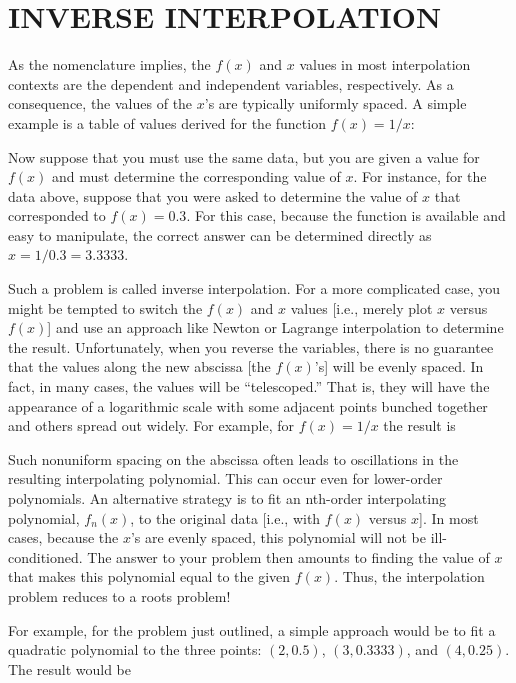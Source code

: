 \documentclass[../main.tex]{subfiles}
\begin{document}
\label{cha:cha_P_17_4} %
\section{INVERSE INTERPOLATION}

\noindent As the nomenclature implies, the $f (x)$ and $x$ values in most interpolation contexts are the
dependent and independent variables, respectively. As a consequence, the values of the $x$'s
are typically uniformly spaced. A simple example is a table of values derived for the function
$f (x) = 1/x$:


Now suppose that you must use the same data, but you are given a value for $f (x)$ and
must determine the corresponding value of $x$. For instance, for the data above, suppose that
you were asked to determine the value of $x$ that corresponded to $f (x) = 0.3$. For this case,
because the function is available and easy to manipulate, the correct answer can be determined directly as $x = 1/0.3 = 3.3333$.

Such a problem is called inverse interpolation. For a more complicated case, you
might be tempted to switch the $f (x)$ and $x$ values [i.e., merely plot $x$ versus $f (x)$] and use
an approach like Newton or Lagrange interpolation to determine the result. Unfortunately,
when you reverse the variables, there is no guarantee that the values along the new abscissa
[the $f (x)$'s] will be evenly spaced. In fact, in many cases, the values will be ``telescoped.''
That is, they will have the appearance of a logarithmic scale with some adjacent points
bunched together and others spread out widely. For example, for $f (x) = 1/x$ the result is


Such nonuniform spacing on the abscissa often leads to oscillations in the resulting interpolating polynomial. This can occur even for lower-order polynomials. An alternative
strategy is to fit an nth-order interpolating polynomial, $f_n (x)$, to the original data [i.e., with
$f (x)$ versus $x$]. In most cases, because the $x$'s are evenly spaced, this polynomial will not
be ill-conditioned. The answer to your problem then amounts to finding the value of $x$ that
makes this polynomial equal to the given $f (x)$. Thus, the interpolation problem reduces to
a roots problem!

For example, for the problem just outlined, a simple approach would be to fit a quadratic polynomial to the three points: $(2, 0.5)$, $(3, 0.3333)$, and $(4, 0.25)$. The result would be
\end{document}
